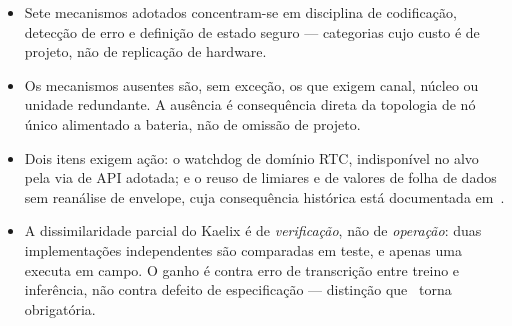 \documentclass[10pt,a4paper,landscape]{article}
\begin{document}
\begin{itemize}
\item Sete mecanismos \textsf{adotados} concentram-se em disciplina de codificação, detecção de erro e definição de estado seguro --- categorias cujo custo é de projeto, não de replicação de hardware.
\item Os mecanismos \textsf{ausentes} são, sem exceção, os que exigem canal, núcleo ou unidade redundante. A ausência é consequência direta da topologia de nó único alimentado a bateria, não de omissão de projeto.
\item Dois itens exigem ação: o watchdog de domínio RTC, indisponível no alvo pela via de API adotada; e o reuso de limiares e de valores de folha de dados sem reanálise de envelope, cuja consequência histórica está documentada em~\cite{esa1996}.
\item A dissimilaridade parcial do Kaelix é de \emph{verificação}, não de \emph{operação}: duas implementações independentes são comparadas em teste, e apenas uma executa em campo. O ganho é contra erro de transcrição entre treino e inferência, não contra defeito de especificação --- distinção que~\cite{knight1986} torna obrigatória.
\end{itemize}
\end{document}
